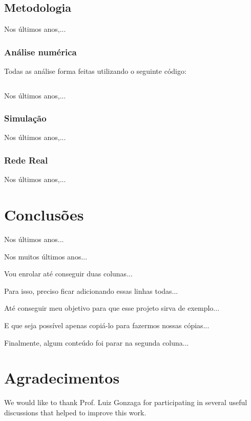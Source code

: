 \documentclass[journal,11pt,twocolumn]{IEEEtran}
\begin{document}
\subsection{Metodologia}

Nos últimos anos,...

\subsubsection{Análise numérica}
Todas as análise forma feitas utilizando o seguinte código:
\inputminted[linenos=true]{python}{code/example.py}

Nos últimos anos,...

\subsubsection{Simulação}

Nos últimos anos,...

\subsubsection{Rede Real}

Nos últimos anos,...

\section{Conclusões}
Nos últimos anos...

Nos muitos últimos anos...

Vou enrolar até conseguir duas colunas...

Para isso, preciso ficar adicionando essas linhas todas...

Até conseguir meu objetivo para que esse projeto sirva de exemplo...

E que seja possível apenas copiá-lo para fazermos nossas cópias...

Finalmente, algum conteúdo foi parar na segunda coluna...

\section*{Agradecimentos}
We would like to thank Prof. Luiz Gonzaga for participating in several useful discussions that helped to improve this work.



\end{document}
